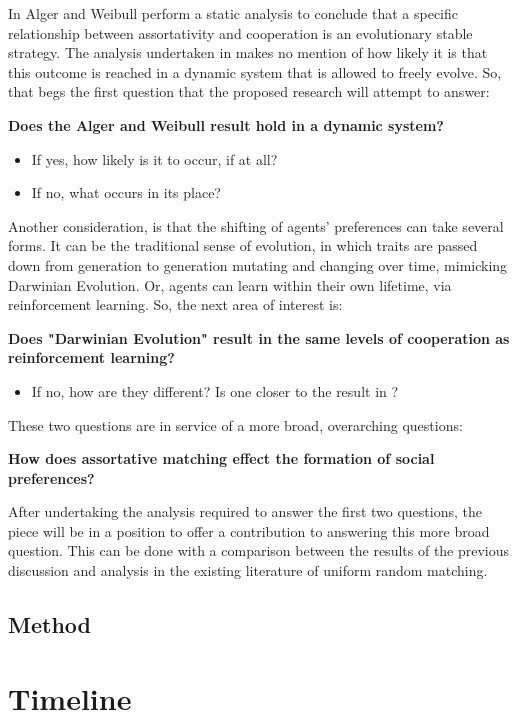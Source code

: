 \documentclass[12pt]{article}
\newcommand*{\np}{\par\noindent\newline}
\begin{document}
In \cite{alger_homo_2013} Alger and Weibull perform a static analysis to
conclude that a specific relationship between assortativity and cooperation is
an evolutionary stable strategy. The analysis undertaken in \cite{alger_homo_2013} makes no mention of how likely it is that this outcome
is reached in a dynamic system that is allowed to freely evolve. So, that begs
the first question that the proposed research will attempt to answer:
\np\textbf{Does the Alger and Weibull result \cite{alger_homo_2013} hold in a dynamic system?}
\begin{itemize}
\item If yes, how likely is it to occur, if at all? 
\item If no, what occurs in its place? 
\end{itemize}
Another consideration, is that the shifting of agents' preferences can take
several forms. It can be the traditional sense of evolution, in which traits
are passed down from generation to generation mutating and changing over time,
mimicking Darwinian Evolution. Or, agents can learn within their own lifetime,
via reinforcement learning. So, the next area of interest is:
\np\textbf{Does "Darwinian Evolution" result in the same levels of cooperation as reinforcement learning?}
\begin{itemize}
\item If no, how are they different? Is one closer to the result in \cite{alger_homo_2013}?
\end{itemize}
These two questions are in service of a more broad, overarching questions:
\np\textbf{How does assortative matching effect the formation of social
preferences?}\np After undertaking the analysis required to answer the first two questions, the piece will be in a position to offer a contribution to
answering this more broad question. This can be done with a comparison between
the results of the previous discussion and analysis in the existing literature
of uniform random matching.
\subsection{Method}
\section{Timeline}


\end{document}
